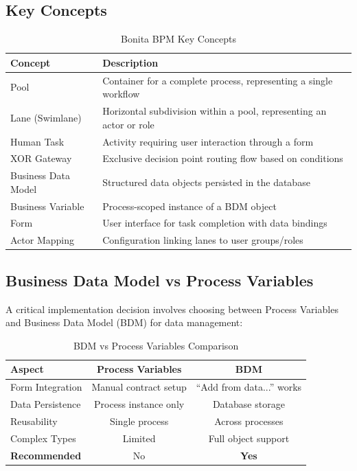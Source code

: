 \documentclass[12pt,a4paper]{article}
\begin{document}
\subsection{Key Concepts}

\begin{table}[H]
\centering
\caption{Bonita BPM Key Concepts}
\begin{tabular}{lp{9cm}}
\toprule
\textbf{Concept} & \textbf{Description} \\
\midrule
Pool & Container for a complete process, representing a single workflow \\
Lane (Swimlane) & Horizontal subdivision within a pool, representing an actor or role \\
Human Task & Activity requiring user interaction through a form \\
XOR Gateway & Exclusive decision point routing flow based on conditions \\
Business Data Model & Structured data objects persisted in the database \\
Business Variable & Process-scoped instance of a BDM object \\
Form & User interface for task completion with data bindings \\
Actor Mapping & Configuration linking lanes to user groups/roles \\
\bottomrule
\end{tabular}
\label{tab:concepts}
\end{table}

\subsection{Business Data Model vs Process Variables}

A critical implementation decision involves choosing between Process Variables and Business Data Model (BDM) for data management:

\begin{table}[H]
\centering
\caption{BDM vs Process Variables Comparison}
\begin{tabular}{lcc}
\toprule
\textbf{Aspect} & \textbf{Process Variables} & \textbf{BDM} \\
\midrule
Form Integration & Manual contract setup & ``Add from data...'' works \\
Data Persistence & Process instance only & Database storage \\
Reusability & Single process & Across processes \\
Complex Types & Limited & Full object support \\
\textbf{Recommended} & No & \textbf{Yes} \\
\bottomrule
\end{tabular}
\label{tab:bdm_comparison}
\end{table}
\end{document}

